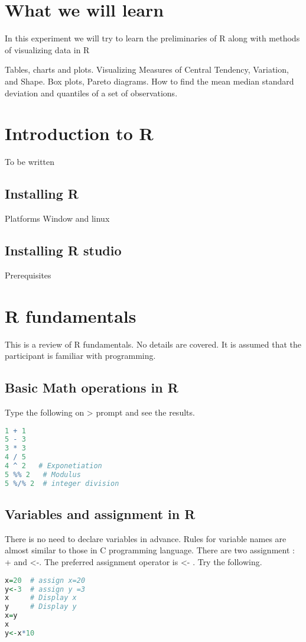 \documentclass["../Applied_probabillity _and_statistics_lab_KTU.tex"]{subfiles}
\begin{document}
\section*{What we will learn}
In this experiment we will try to  learn the preliminaries of R along with methods of visualizing data in R

Tables, charts and plots. Visualizing Measures of Central Tendency, Variation,
and Shape. Box plots, Pareto diagrams. How to find the mean median standard
deviation and quantiles of a set of observations.




\section{Introduction to R}
To be written 
\subsection{Installing R }
  Platforms Window and linux
\subsection{Installing R studio}
 Prerequisites 
 \section{R fundamentals}
 
This is a review of R fundamentals. No details are covered. It is assumed that the participant is familiar with programming.
\subsection{Basic Math operations in R}
Type the following  on > prompt and see the results. 
 \begin{lstlisting}[language=R]
1 + 1
5 - 3
3 * 3
4 / 5
4 ^ 2   # Exponetiation
5 %% 2   # Modulus
5 %/% 2  # integer division


\end{lstlisting}

\subsection{Variables and assignment in R}
 There is no  need to declare variables in advance. Rules for variable names are almost similar to those in C programming language. There are two assignment : + and <-.  The preferred assignment operator is <- . 
 Try the following.
  \begin{lstlisting}[language=R]
x=20  # assign x=20
y<-3  # assign y =3
x     # Display x
y     # Display y
x=y
x
y<-x*10

\end{lstlisting}
\end{document}
